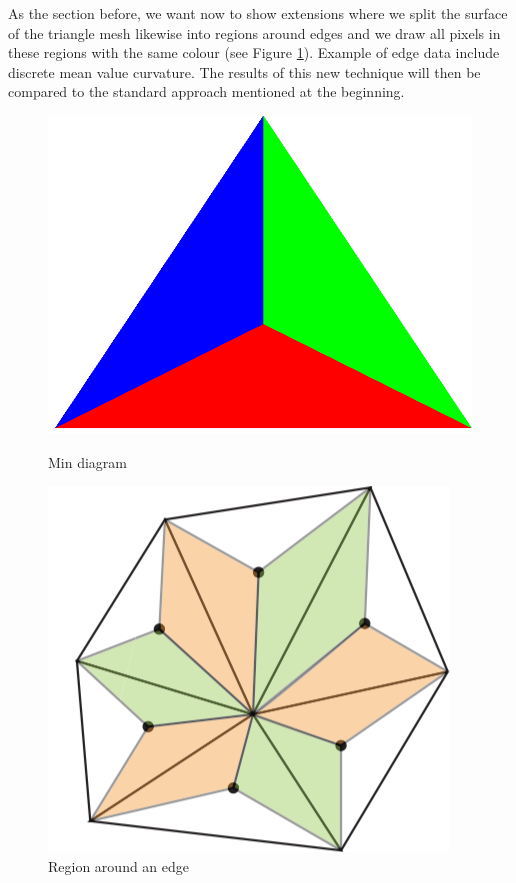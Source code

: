 As the section before, we want now to show extensions where we split the surface of the triangle mesh likewise into regions around  edges and we draw all pixels in these regions with the same colour (see Figure \ref{fig:edge-area}). Example of edge data include discrete mean value curvature. The results of this new technique will then be compared to the standard approach mentioned at the beginning.

\begin{figure}[H]
    \centering
    \centering
    \includegraphics[scale=0.15]{images/min.png}
    \caption{Min diagram}\label{fig:min-diagram}
    \endminipage\hfill
    \centering
    \includegraphics[scale=0.6]{images/edge-area.png}
    \caption{Region around an edge}\label{fig:edge-area}
    \endminipage
\end{figure}

